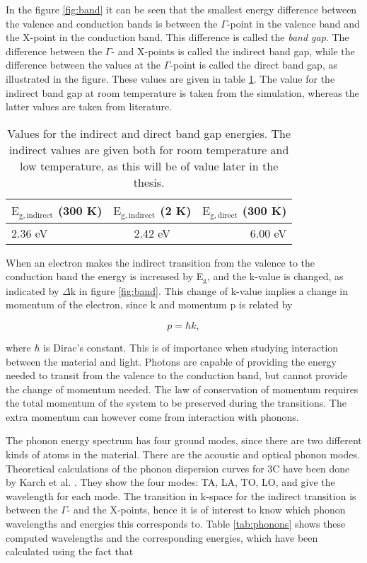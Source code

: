In the figure \ref{fig:band} it can be seen that the smallest energy difference between the valence and conduction bands is between the $\Gamma$-point in the valence band and the X-point in the conduction band. This difference is called the \emph{band gap}. The difference between the $\Gamma$- and X-points is called the indirect band gap, while the difference between the values at the $\Gamma$-point is called the direct band gap, as illustrated in the figure. These values are given in table \ref{tab:eg}. The value for the indirect band gap at room temperature is taken from the simulation, whereas the latter values are taken from literature. 

\begin{table}[h]
\caption{Values for the indirect and direct band gap energies. The indirect values are given both for room temperature and low temperature, as this will be of value later in the thesis.}
\label{tab:eg}
\begin{center}
\begin{tabular}{ l c r }
  \hline                       
  \hline       
  \vspace{1mm}
    $\mathrm{E_{g,indirect}}$  (300 K) & $\mathrm{E_{g,indirect}}$ (2 K) & $\mathrm{E_{g,direct}}$  (300 K)\\
    \hline
  2.36 eV & 2.42 eV \cite{Bimberg1981} & 6.00 eV \cite{Dalven1965}\\
  \hline  
\end{tabular}
\end{center}
\end{table}

When an electron makes the indirect transition from the valence to the conduction band the energy is increased by E$_\mathrm{g}$, and the k-value is changed, as indicated by $\Delta \mathrm{k}$ in figure \ref{fig:band}. This change of k-value implies a change in momentum of the electron, since k and momentum p is related by

\[p = \hbar k,\]

\noindent where $\hbar$ is Dirac's constant. This is of importance when studying interaction between the material and light. Photons are capable of providing the energy needed to transit from the valence to the conduction band, but cannot provide the change of momentum needed. The law of conservation of momentum requires the total momentum of the system to be preserved during the transitions. The extra momentum can however come from interaction with phonons. 

The phonon energy spectrum has four ground modes, since there are two different kinds of atoms in the material. There are the acoustic and optical phonon modes. Theoretical calculations of the phonon dispersion curves for 3C have been done by Karch et al. \cite{Karch1994}. They show the four modes: TA, LA, TO, LO, and give the wavelength for each mode. The transition in k-space for the indirect transition is between the $\Gamma$- and the X-points, hence it is of interest to know which phonon wavelengths and energies this corresponds to.  Table \ref{tab:phonons} shows these computed wavelengths and the corresponding energies, which have been calculated using the fact that

